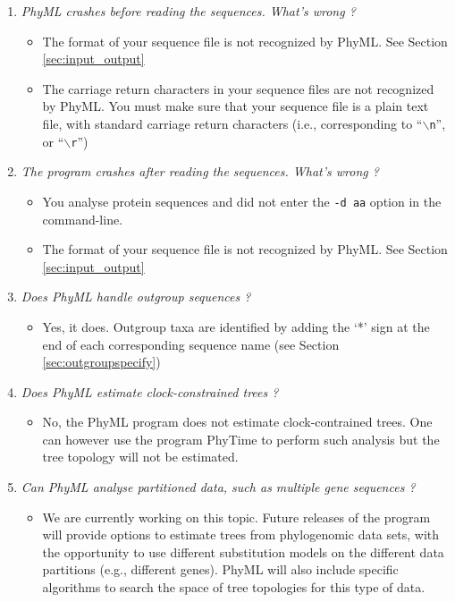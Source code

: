 \documentclass[a4paper,12pt]{article}
\newcommand{\x}[1]{\texttt{#1}}
\begin{document}
\begin{enumerate}
\item {\it PhyML crashes before reading the sequences. What's wrong ?}\\
\begin{itemize}
\item The format of your sequence file is not recognized by PhyML. See Section \ref{sec:input_output}
\item The carriage return characters in your sequence files are not recognized by PhyML. You must
  make sure that your sequence file is a plain text file, with standard carriage return characters (i.e.,
  corresponding to ``$\backslash$\x{n}'', or ``$\backslash$\x{r}'')
\end{itemize}
\item {\it The program crashes after reading the sequences. What's wrong ?}\\
\begin{itemize}
\item You analyse protein sequences and did not enter the \x{-d aa} option in the command-line.
\item The format of your sequence file is not recognized by PhyML. See Section \ref{sec:input_output}
\end{itemize}
\item {\it Does PhyML handle outgroup sequences ?}\\
\begin{itemize}
\item Yes, it does. Outgroup taxa are identified by adding the `*' sign at the end of each
  corresponding sequence name (see Section \ref{sec:outgroupspecify})
\end{itemize}
\item {\it Does PhyML estimate clock-constrained trees ?}\\
\begin{itemize}
\item No, the PhyML program does not estimate clock-contrained trees. One can however use the
  program PhyTime to perform such analysis but the tree topology will not be estimated.
\end{itemize}
\item {\it Can PhyML analyse partitioned data, such as multiple gene sequences ?}\\
\begin{itemize}
\item We are currently  working on this topic.  Future releases of  the program will provide options
to estimate  trees from phylogenomic data sets,  with the opportunity to  use different substitution
models on  the different data partitions (e.g.,  different genes). PhyML will  also include specific
algorithms to search the space of tree topologies for this type of data.
\end{itemize}
\end{enumerate}
\end{document}
